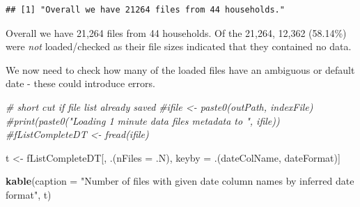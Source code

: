\documentclass[]{article}
\newenvironment{Shaded}{\begin{snugshade}}{\end{snugshade}}
\newcommand{\KeywordTok}[1]{\textcolor[rgb]{0.13,0.29,0.53}{\textbf{#1}}}
\newcommand{\DataTypeTok}[1]{\textcolor[rgb]{0.13,0.29,0.53}{#1}}
\newcommand{\StringTok}[1]{\textcolor[rgb]{0.31,0.60,0.02}{#1}}
\newcommand{\CommentTok}[1]{\textcolor[rgb]{0.56,0.35,0.01}{\textit{#1}}}
\newcommand{\OperatorTok}[1]{\textcolor[rgb]{0.81,0.36,0.00}{\textbf{#1}}}
\newcommand{\NormalTok}[1]{#1}
\begin{document}
\begin{Shaded}
\end{Shaded}

\begin{verbatim}
## [1] "Overall we have 21264 files from 44 households."
\end{verbatim}

\begin{Shaded}
\end{Shaded}

Overall we have 21,264 files from 44 households. Of the 21,264, 12,362
(58.14\%) were \emph{not} loaded/checked as their file sizes indicated
that they contained no data.

We now need to check how many of the loaded files have an ambiguous or
default date - these could introduce errors.

\begin{Shaded}
\begin{Highlighting}[]
\CommentTok{# short cut if file list already saved}
\CommentTok{#ifile <- paste0(outPath, indexFile)}
\CommentTok{#print(paste0("Loading 1 minute data files metadata to ", ifile))}
\CommentTok{#fListCompleteDT <- fread(ifile)}
  
  
\NormalTok{t <-}\StringTok{ }\NormalTok{fListCompleteDT[, .(}\DataTypeTok{nFiles =}\NormalTok{ .N), keyby =}\StringTok{ }\NormalTok{.(dateColName, dateFormat)]}

\KeywordTok{kable}\NormalTok{(}\DataTypeTok{caption =} \StringTok{"Number of files with given date column names by inferred date format"}\NormalTok{, t)}
\end{Highlighting}
\end{Shaded}
\end{document}
